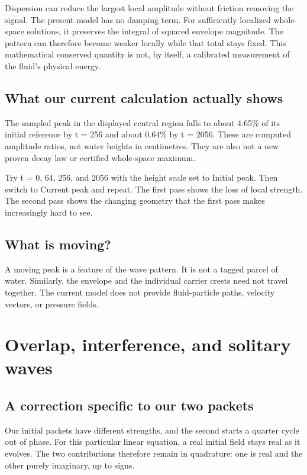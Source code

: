 \documentclass[10pt]{article}
\begin{document}
Dispersion can reduce the largest local amplitude without friction removing the signal. The present model has no damping term. For sufficiently localized whole-space solutions, it preserves the integral of squared envelope magnitude. The pattern can therefore become weaker locally while that total stays fixed. This mathematical conserved quantity is not, by itself, a calibrated measurement of the fluid's physical energy.

\subsection{What our current calculation actually shows}

The sampled peak in the displayed central region falls to about 4.65\% of its initial reference by t = 256 and about 0.64\% by t = 2056. These are computed amplitude ratios, not water heights in centimetres. They are also not a new proven decay law or certified whole-space maximum.

Try t = 0, 64, 256, and 2056 with the height scale set to Initial peak. Then switch to Current peak and repeat. The first pass shows the loss of local strength. The second pass shows the changing geometry that the first pass makes increasingly hard to see.

\subsection{What is moving?}

A moving peak is a feature of the wave pattern. It is not a tagged parcel of water. Similarly, the envelope and the individual carrier crests need not travel together. The current model does not provide fluid-particle paths, velocity vectors, or pressure fields.

\section{Overlap, interference, and solitary waves}

\subsection{A correction specific to our two packets}

Our initial packets have different strengths, and the second starts a quarter cycle out of phase. For this particular linear equation, a real initial field stays real as it evolves. The two contributions therefore remain in quadrature: one is real and the other purely imaginary, up to signs.
\end{document}
